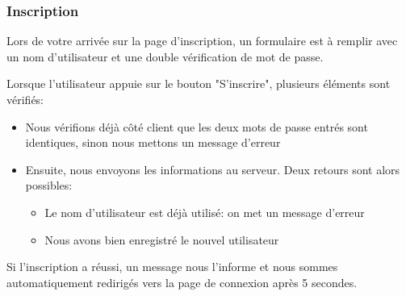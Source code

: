 \documentclass[12pt,french]{article}
\begin{document}
\subsubsection{Inscription}

Lors de votre arrivée sur la page d'inscription, un formulaire est à remplir avec un nom d'utilisateur et une double vérification de mot de passe.

Lorsque l'utilisateur appuie sur le bouton "S'inscrire", plusieurs éléments sont vérifiés:

\begin{itemize}
	\item Nous vérifions déjà côté client que les deux mots de passe entrés sont identiques, sinon nous mettons un message d'erreur
	\item Ensuite, nous envoyons les informations au serveur. Deux retours sont alors possibles:
	\begin{itemize}
		\item Le nom d'utilisateur est déjà utilisé: on met un message d'erreur
		\item Nous avons bien enregistré le nouvel utilisateur
	\end{itemize}
\end{itemize}

\medskip

Si l'inscription a réussi, un message nous l'informe et nous sommes automatiquement redirigés vers la page de connexion après 5 secondes.
\end{document}
